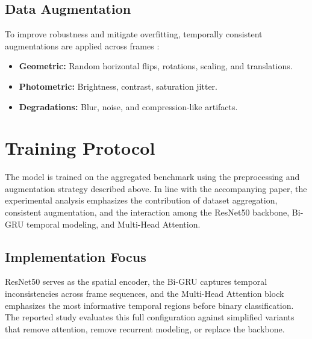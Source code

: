 \subsection{Data Augmentation}
To improve robustness and mitigate overfitting, temporally consistent augmentations are applied across frames \cite{mubarak2023survey}:
\begin{itemize}
    \item \textbf{Geometric:} Random horizontal flips, rotations, scaling, and translations.
    \item \textbf{Photometric:} Brightness, contrast, saturation jitter.
    \item \textbf{Degradations:} Blur, noise, and compression-like artifacts.
\end{itemize}

\section{Training Protocol}
The model is trained on the aggregated benchmark using the preprocessing and augmentation strategy described above. In line with the accompanying paper, the experimental analysis emphasizes the contribution of dataset aggregation, consistent augmentation, and the interaction among the ResNet50 backbone, Bi-GRU temporal modeling, and Multi-Head Attention.

\subsection{Implementation Focus}
ResNet50 serves as the spatial encoder, the Bi-GRU captures temporal inconsistencies across frame sequences, and the Multi-Head Attention block emphasizes the most informative temporal regions before binary classification. The reported study evaluates this full configuration against simplified variants that remove attention, remove recurrent modeling, or replace the backbone.

